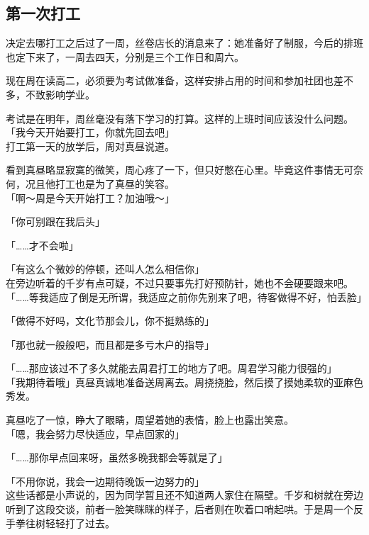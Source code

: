 \subsection{第一次打工}

决定去哪打工之后过了一周，丝卷店长的消息来了：她准备好了制服，今后的排班也定下来了，一周去四天，分别是三个工作日和周六。

现在周在读高二，必须要为考试做准备，这样安排占用的时间和参加社团也差不多，不致影响学业。

考试是在明年，周丝毫没有落下学习的打算。这样的上班时间应该没什么问题。\\

「我今天开始要打工，你就先回去吧」\\

打工第一天的放学后，周对真昼说道。

看到真昼略显寂寞的微笑，周心疼了一下，但只好憋在心里。毕竟这件事情无可奈何，况且他打工也是为了真昼的笑容。\\

「啊～周是今天开始打工？加油哦～」

「你可别跟在我后头」

「……才不会啦」

「有这么个微妙的停顿，还叫人怎么相信你」\\

在旁边听着的千岁有点可疑，不过只要事先打好预防针，她也不会硬要跟来吧。\\

「……等我适应了倒是无所谓，我适应之前你先别来了吧，待客做得不好，怕丢脸」

「做得不好吗，文化节那会儿，你不挺熟练的」

「那也就一般般吧，而且都是多亏木户的指导」

「……那应该过不了多久就能去周君打工的地方了吧。周君学习能力很强的」\\

「我期待着哦」真昼真诚地准备送周离去。周挠挠脸，然后摸了摸她柔软的亚麻色秀发。

真昼吃了一惊，睁大了眼睛，周望着她的表情，脸上也露出笑意。\\

「嗯，我会努力尽快适应，早点回家的」

「……那你早点回来呀，虽然多晚我都会等就是了」

「不用你说，我会一边期待晚饭一边努力的」\\

这些话都是小声说的，因为同学暂且还不知道两人家住在隔壁。千岁和树就在旁边听到了这段交谈，前者一脸笑眯眯的样子，后者则在吹着口哨起哄。于是周一个反手拳往树轻轻打了过去。


